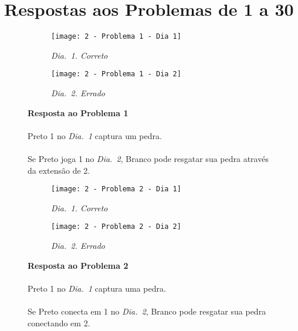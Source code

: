 \pagebreak

\section{Respostas aos Problemas de 1 a 30}

\begin{SCfigure}[][h!]
    \begin{subfigure}[t]{.31\textwidth}
        \texttt{[image: 2 - Problema 1 - Dia 1]}
        \caption*{\emph{Dia.\@~1. Correto}}
    \end{subfigure}
    \hfill
    \begin{subfigure}[t]{.31\textwidth}
        \texttt{[image: 2 - Problema 1 - Dia 2]}
        \caption*{\emph{Dia.\@~2. Errado}}
    \end{subfigure}
    \hfill
    \caption*{\textbf{Resposta ao Problema 1}\\\\Preto 1 no \emph{Dia.\@~1} captura um pedra.\\\\Se Preto joga 1 no \emph{Dia.\@~2}, Branco pode resgatar sua pedra através da extensão de 2.}
\end{SCfigure}

\vfill

\begin{SCfigure}[][h!]
    \begin{subfigure}[t]{.31\textwidth}
        \texttt{[image: 2 - Problema 2 - Dia 1]}
        \caption*{\emph{Dia.\@~1. Correto}}
    \end{subfigure}
    \hfill
    \begin{subfigure}[t]{.31\textwidth}
        \texttt{[image: 2 - Problema 2 - Dia 2]}
        \caption*{\emph{Dia.\@~2. Errado}}
    \end{subfigure}
    \hfill
    \caption*{\textbf{Resposta ao Problema 2}\\\\Preto 1 no \emph{Dia.\@~1} captura uma pedra.\\\\Se Preto conecta em 1 no \emph{Dia.\@~2}, Branco pode resgatar sua pedra conectando em 2.}
\end{SCfigure}

\vfill

